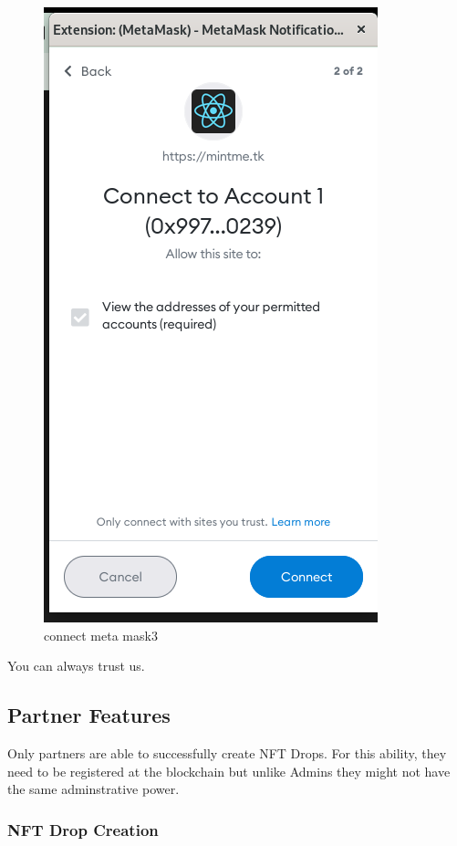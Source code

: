 \documentclass[
]{article}
\begin{document}
\begin{figure}
\centering
\includegraphics{images/metamask_wallet_connection2.png}
\caption{connect meta mask3}
\end{figure}\newpage

You can always trust us.

\hypertarget{partner-features}{%
\subsection{Partner Features}\label{partner-features}}

Only partners are able to successfully create NFT Drops. For this
ability, they need to be registered at the blockchain but unlike Admins
they might not have the same adminstrative power.

\hypertarget{nft-drop-creation}{%
\subsubsection{NFT Drop Creation}\label{nft-drop-creation}}
\end{document}
